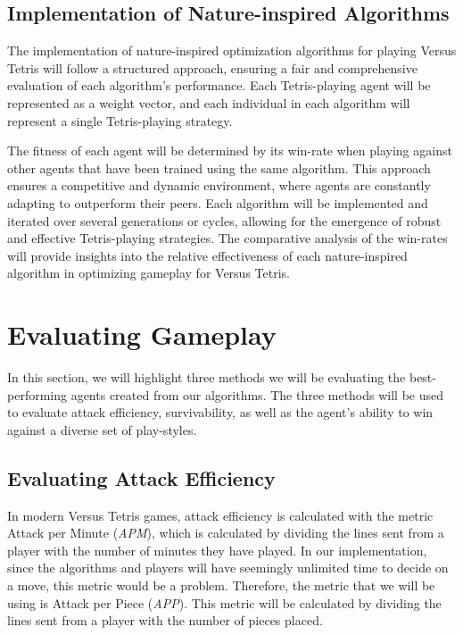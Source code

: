 \documentclass[a4paper, 12pt]{extreport}
\begin{document}
	\subsection{Implementation of Nature-inspired Algorithms}
	
	The implementation of nature-inspired optimization algorithms for playing Versus Tetris will follow a structured approach, ensuring a fair and comprehensive evaluation of each algorithm's performance. Each Tetris-playing agent will be represented as a weight vector, and each individual in each algorithm will represent a single Tetris-playing strategy. 
	
	The fitness of each agent will be determined by its win-rate when playing against other agents that have been trained using the same algorithm. This approach ensures a competitive and dynamic environment, where agents are constantly adapting to outperform their peers. Each algorithm will be implemented and iterated over several generations or cycles, allowing for the emergence of robust and effective Tetris-playing strategies. The comparative analysis of the win-rates will provide insights into the relative effectiveness of each nature-inspired algorithm in optimizing gameplay for Versus Tetris.
	
	\section{Evaluating Gameplay}\label{sec:evaluation}
	
	In this section, we will highlight three methods we will be evaluating the best-performing agents created from our algorithms. The three methods will be used to evaluate attack efficiency, survivability, as well as the agent's ability to win against a diverse set of play-styles.
	
	\subsection{Evaluating Attack Efficiency}
	
	In modern Versus Tetris games, attack efficiency is calculated with the metric Attack per Minute (\textit{APM}), which is calculated by dividing the lines sent from a player with the number of minutes they have played. In our implementation, since the algorithms and players will have seemingly unlimited time to decide on a move, this metric would be a problem. Therefore, the metric that we will be using is Attack per Piece (\textit{APP}). This metric will be calculated by dividing the lines sent from a player with the number of pieces placed.
	
\end{document}
